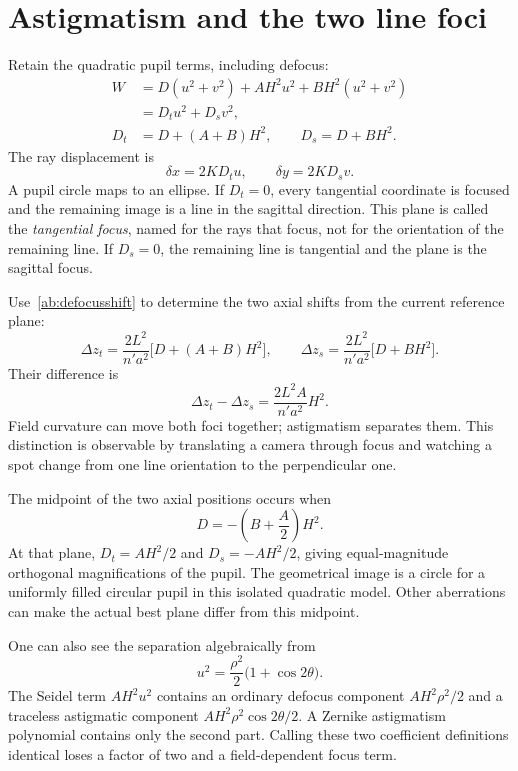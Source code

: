 \section{Astigmatism and the two line foci}
Retain the quadratic pupil terms, including defocus:
\begin{align}
 W&=D(u^2+v^2)+AH^2u^2+BH^2(u^2+v^2)\\
  &=D_tu^2+D_sv^2,\\
 D_t&=D+(A+B)H^2,\qquad D_s=D+BH^2.
 \label{ab:DtDs}
\end{align}
The ray displacement is
\begin{equation}
 \delta x=2KD_tu,\qquad \delta y=2KD_sv.
 \label{ab:astigrays}
\end{equation}
A pupil circle maps to an ellipse. If $D_t=0$, every tangential coordinate is
focused and the remaining image is a line in the sagittal direction. This
plane is called the \emph{tangential focus}, named for the rays that focus,
not for the orientation of the remaining line. If $D_s=0$, the remaining line
is tangential and the plane is the sagittal focus.

Use~\eqref{ab:defocusshift} to determine the two axial shifts from the current
reference plane:
\begin{equation}
 \Delta z_t=\frac{2L^2}{n'a^2}\bigl[D+(A+B)H^2\bigr],\qquad
 \Delta z_s=\frac{2L^2}{n'a^2}\bigl[D+BH^2\bigr].
 \label{ab:astigfoci}
\end{equation}
Their difference is
\begin{equation}
 \boxed{\Delta z_t-\Delta z_s=
             \frac{2L^2A}{n'a^2}H^2.}
\end{equation}
Field curvature can move both foci together; astigmatism separates them.
This distinction is observable by translating a camera through focus and
watching a spot change from one line orientation to the perpendicular one.

The midpoint of the two axial positions occurs when
\begin{equation}
 D=-\left(B+\frac{A}{2}\right)H^2.
 \label{ab:medialfocus}
\end{equation}
At that plane, $D_t=AH^2/2$ and $D_s=-AH^2/2$, giving equal-magnitude
orthogonal magnifications of the pupil. The geometrical image is a circle
for a uniformly filled circular pupil in this isolated quadratic model.
Other aberrations can make the actual best plane differ from this midpoint.

One can also see the separation algebraically from
\begin{equation}
 u^2=\frac{\rho^2}{2}\bigl(1+\cos2\theta\bigr).
\end{equation}
The Seidel term $AH^2u^2$ contains an ordinary defocus component
$AH^2\rho^2/2$ and a traceless astigmatic component
$AH^2\rho^2\cos2\theta/2$. A Zernike astigmatism polynomial contains only
the second part. Calling these two coefficient definitions identical loses a
factor of two and a field-dependent focus term.

